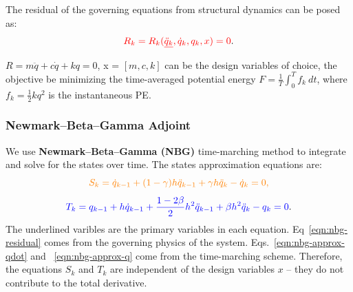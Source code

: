 \documentclass{beamer}
\newenvironment{noheadline}{
    \setbeamertemplate{headline}{}
    \addtobeamertemplate{frametitle}{\vspace*{-1.5\baselineskip}}{}
}{}
\begin{document}
\begin{noheadline}
\begin{frame}[allowframebreaks]
{  The residual of the governing equations from structural dynamics
  can be posed as: 
  \begin{equation}\label{eqn:nbg-residual}
    \textcolor{red}{R_k = R_k(\underline{\ddot{q}_k}, \dot{q}_k, q_k, x) = 0}.
  \end{equation}
  \begin{example} 
    $R = m\ddot{q} + c\dot{q} + k{q} = 0$, x = $[m,
      c, k]$ can be the design variables of choice, the objective be
    minimizing the time-averaged potential energy $F = \frac{1}{T}
    \int_{0}^T f_k~dt$, where $f_k = \frac{1}{2} kq^2$ is the
    instantaneous PE.
  \end{example}
}
\end{frame}

\begin{frame}\frametitle{Newmark--Beta--Gamma Adjoint}
\scriptsize{
  \begin{minipage}{0.6\linewidth}
    We use \textbf{Newmark--Beta--Gamma (NBG)} time-marching method to
    integrate and solve for the states over time.  The states
    approximation equations are:
    \begin{equation}\label{eqn:nbg-approx-qdot}
      \textcolor{orange}{S_k =  \dot{q}_{k-1}  + (1-\gamma) h \ddot{q}_{k-1} +  \gamma h \ddot{q}_{k}- \dot{q}_k=0, }
    \end{equation}
    \begin{equation}\label{eqn:nbg-approx-q}
      \textcolor{blue}{T_k = {q}_{k-1} + h \dot{q}_{k-1} +\frac{1-2\beta}{2}
        h^2\ddot{q}_{k-1} + \beta h^2 \ddot{q}_k-{q}_k=0}. 
    \end{equation}
    The underlined varibles are the primary variables in each equation.
    Eq~\eqref{eqn:nbg-residual} comes from the governing physics of
    the system. Eqs.~\eqref{eqn:nbg-approx-qdot} and
    ~\eqref{eqn:nbg-approx-q} come from the time-marching
    scheme. Therefore, the equations $S_k$ and $T_k$ are independent
    of the design variables $x$ -- they do not contribute to the total
    derivative. 
  \end{minipage}
  \begin{minipage}{0.39\linewidth}
    \begin{figure}
      \centering

\end{figure}
\end{minipage}}
\end{frame}
\end{noheadline}
\end{document}

